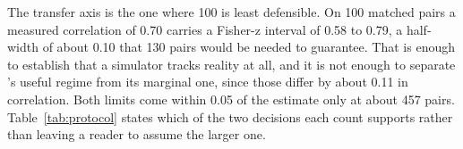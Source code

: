 The transfer axis is the one where 100 is least defensible. On 100 matched pairs a measured
correlation of 0.70 carries a Fisher-z interval of 0.58 to 0.79, a half-width of about 0.10 that
130 pairs would be needed to guarantee. That is enough to establish that a simulator tracks
reality at all, and it is not enough to separate \cite{suresim_2025}'s useful regime from its
marginal one, since those differ by about 0.11 in correlation. Both limits come within 0.05 of the
estimate only at about 457 pairs. Table~\ref{tab:protocol} states which of the two decisions each
count supports rather than leaving a reader to assume the larger one.
